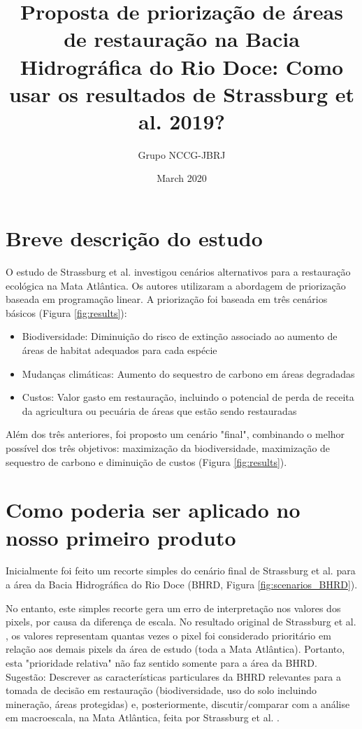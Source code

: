 \documentclass{article}
\title{Proposta de priorização de áreas de restauração na Bacia Hidrográfica do Rio Doce: Como usar os resultados de Strassburg et al. 2019?}
\author{Grupo NCCG-JBRJ}
\date{March 2020}
\begin{document}
\maketitle

\section{Breve descrição do estudo}
O estudo de Strassburg et al. \cite{Strassburg2019} investigou cenários alternativos para a restauração ecológica na Mata Atlântica. Os autores utilizaram a abordagem de priorização baseada em programação linear. A priorização foi baseada em três cenários básicos (Figura \ref{fig:results}): 

\begin{itemize}
    \item Biodiversidade: Diminuição do risco  de extinção associado ao aumento de áreas de habitat adequados para cada espécie
    \item Mudanças climáticas: Aumento do sequestro de carbono em áreas degradadas
    \item Custos: Valor gasto em restauração, incluindo o potencial de perda de receita da agricultura ou pecuária de áreas que estão sendo restauradas
\end{itemize}
 
Além dos três anteriores, foi proposto um cenário "final", combinando o melhor possível dos três objetivos: maximização da biodiversidade, maximização de sequestro de carbono e diminuição de custos (Figura \ref{fig:results}).

\section{Como poderia ser aplicado no nosso primeiro produto}
Inicialmente foi feito um recorte simples do cenário final de Strassburg et al. \cite{Strassburg2019} para a área da Bacia Hidrográfica do Rio Doce (BHRD, Figura \ref{fig:scenarios_BHRD}).

No entanto, este simples recorte gera um erro de interpretação nos valores dos pixels, por causa da diferença de escala. No resultado original de Strassburg et al. \cite{Strassburg2019}, os valores representam quantas vezes o pixel foi considerado prioritário em relação aos demais pixels da área de estudo (toda a Mata Atlântica). Portanto, esta "prioridade relativa" não faz sentido somente para a área da BHRD.
Sugestão: Descrever as características particulares da BHRD relevantes para a tomada de decisão em restauração (biodiversidade, uso do solo incluindo mineração, áreas protegidas) e, posteriormente, discutir/comparar com a análise em macroescala, na Mata Atlântica, feita por Strassburg et al. \cite{Strassburg2019}.
\end{document}
